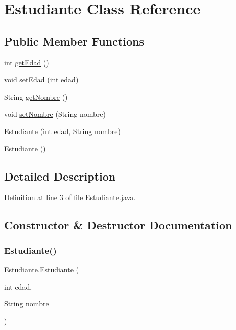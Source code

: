 \hypertarget{class_estudiante}{}\section{Estudiante Class Reference}
\label{class_estudiante}
\subsection*{Public Member Functions}
\begin{DoxyCompactItemize}
\item 
int \mbox{\hyperlink{class_estudiante_a03cc036ac2458b681a4b500357f8fca9}{get\+Edad}} ()
\item 
void \mbox{\hyperlink{class_estudiante_a52a02fb5162fd2d124270d071b309660}{set\+Edad}} (int edad)
\item 
String \mbox{\hyperlink{class_estudiante_adfce6c01a636fa3d5b095fa772b71edf}{get\+Nombre}} ()
\item 
void \mbox{\hyperlink{class_estudiante_aa8a4d05708647b2b143cb444bcb5b52c}{set\+Nombre}} (String nombre)
\item 
\mbox{\hyperlink{class_estudiante_a0c381f743ad5bf92fff83ff07245b86e}{Estudiante}} (int edad, String nombre)
\item 
\mbox{\hyperlink{class_estudiante_a4eb8217a6432c3fc5f01d6ad0a534af1}{Estudiante}} ()
\end{DoxyCompactItemize}


\subsection{Detailed Description}


Definition at line 3 of file Estudiante.\+java.



\subsection{Constructor \& Destructor Documentation}
\mbox{\label{class_estudiante_a0c381f743ad5bf92fff83ff07245b86e}} 
\subsubsection{\texorpdfstring{Estudiante()}{Estudiante()}\hspace{0.1cm}{\footnotesize\ttfamily [1/2]}}
{\footnotesize\ttfamily Estudiante.\+Estudiante (\begin{DoxyParamCaption}\item[{int}]{edad,  }\item[{String}]{nombre }\end{DoxyParamCaption})\hspace{0.3cm}{\ttfamily [inline]}}



